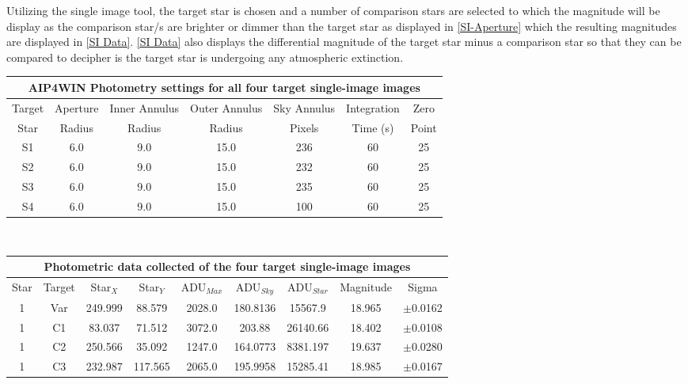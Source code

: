 \documentclass[12pt]{article}
\begin{document}
Utilizing the single image tool, the target star is chosen and a number of comparison stars are selected to which the magnitude will be display as the comparison star/s are brighter or dimmer than the target star as displayed in \cref{SI-Aperture} which the resulting magnitudes are displayed in \cref{SI Data}. \cref{SI Data} also displays the differential magnitude of the target star minus a comparison star so that they can be compared to decipher is the target star is undergoing any atmospheric extinction. \\ 

\begin{table}[H]
\begin{center}
 \footnotesize
 \begin{tabular}{|c||c|c|c||c||c|c|}
 \hline
 \multicolumn{7}{|c|}{AIP4WIN Photometry settings for all four target single-image images} \\
 \hline \hline
 Target & Aperture & Inner Annulus & Outer Annulus & Sky Annulus & Integration & Zero  \\
 Star & Radius & Radius & Radius & Pixels & Time (s) & Point \\
 \hline \hline
 S1 & 6.0 & 9.0 & 15.0 & 236 & 60 & 25 \\
 \hline
 S2 & 6.0 & 9.0 & 15.0 & 232 & 60 & 25 \\
 \hline
 S3 & 6.0 & 9.0 & 15.0 & 235 & 60 & 25 \\
 \hline
 S4 & 6.0 & 9.0 & 15.0 & 100 & 60 & 25  \\
 \hline
 \end{tabular} \\ [0.5cm]
 \begin{tabular}{|c|c||c|c||c|c|c||c|c|}
 \hline
 \multicolumn{9}{|c|}{Photometric data collected of the four target single-image images} \\
 \hline \hline
 Star & Target & Star$_X$ & Star$_Y$ & ADU$_{Max}$ & ADU$_{Sky}$ & ADU$_{Star}$ & Magnitude & Sigma\\
 \hline \hline
 1& Var & 249.999  & 88.579&     2028.0       &    180.8136    &15567.9   &18.965 &$\pm$0.0162 \\
 1&  C1 &  83.037   &71.512   &  3072.0         &     203.88  & 26140.66   &18.402 &$\pm$0.0108 \\
 1&  C2  &250.566   &35.092   &  1247.0         &   164.0773 &  8381.197  & 19.637 &$\pm$0.0280\\
 1&  C3  &232.987  &117.565    & 2065.0          &    195.9958 &  15285.41  & 18.985 & $\pm$0.0167\\

\end{tabular}
\end{center}
\end{table}
\end{document}
